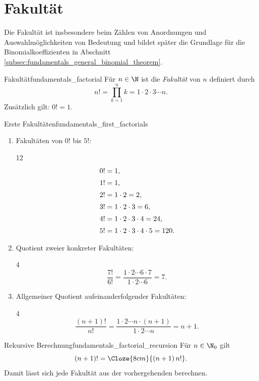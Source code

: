 \section{Fakultät}
\label{sec:fundamentals_factorial}

Die Fakultät ist insbesondere beim Zählen von Anordnungen und
Auswahlmöglichkeiten von Bedeutung und bildet später die Grundlage für die
Binomialkoeffizienten in Abschnitt \ref{subsec:fundamentals_general_binomial_theorem}.

\begin{DefinitionBox}{Fakultät}{fundamentals_factorial}
  Für $n\in\N$ ist die \emph{Fakultät}  von $n$
  definiert durch
  \[
    n!=\prod_{k=1}^{n}k=1\cdot2\cdot3\cdots n.
  \]
  Zusätzlich gilt: $0!=1.$
\end{DefinitionBox}

\begin{ExampleBox}{Erste Fakultäten}{fundamentals_first_factorials}
  \begin{enumerate}[label=\alph*),leftmargin=2em,itemsep=0.8em]
    \item Fakultäten von $0!$ bis $5!$:
      \begin{ClozeArea}[28]{12}
        \[
          \begin{array}{r@{\;}c@{\;}l}
            0!&=&1,\\[0.5em]
            1!&=&1,\\[0.5em]
            2!&=&1\cdot2=2,\\[0.5em]
            3!&=&1\cdot2\cdot3=6,\\[0.5em]
            4!&=&1\cdot2\cdot3\cdot4=24,\\[0.5em]
            5!&=&1\cdot2\cdot3\cdot4\cdot5=120.
          \end{array}
        \]
      \end{ClozeArea}

    \item Quotient zweier konkreter Fakultäten:
      \begin{ClozeArea}[28]{4}
        \[
          \frac{7!}{6!}
            =\frac{1\cdot2\cdots6\cdot7}{1\cdot2\cdots6}
            =7.
        \]
      \end{ClozeArea}

    \item Allgemeiner Quotient aufeinanderfolgender Fakultäten:
      \begin{ClozeArea}[28]{4}
        \[
          \frac{(n+1)!}{n!}
            =\frac{1\cdot2\cdots n\cdot(n+1)}{1\cdot2\cdots n}
            =n+1.
        \]
      \end{ClozeArea}
  \end{enumerate}
\end{ExampleBox}

\begin{KeyPointBox}{Rekursive Berechnung}{fundamentals_factorial_recursion}
  Für $n\in\N_0$ gilt
  \[
    (n+1)!=\Cloze{8cm}{(n+1)\,n!}.
  \]
  Damit lässt sich jede Fakultät aus der vorhergehenden berechnen.
\end{KeyPointBox}
